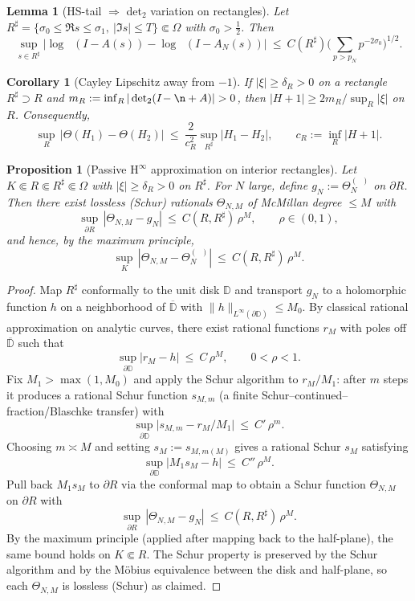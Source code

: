 \documentclass[11pt]{article}
\newtheorem{proposition}[theorem]{Proposition}
\newtheorem{lemma}[theorem]{Lemma}
\newtheorem{corollary}[theorem]{Corollary}
\theoremstyle{remark}
\DeclareMathOperator{\dettwo}{det_2}
\begin{document}
\begin{lemma}[HS-tail $\Rightarrow$ det$_2$ variation on rectangles]\label{lem:HS-tail-rectangle}
Let $R^\sharp=\{\sigma_0\le \Re s\le \sigma_1,\ |\Im s|\le T\}\Subset\Omega$ with $\sigma_0>\tfrac12$. Then
\[
 \sup_{s\in R^\sharp}\big|\log\dettwo(I-A(s))\!-\!\log\dettwo(I-A_N(s))\big|\ \le\ C(R^\sharp)\Big(\sum_{p>p_N}p^{-2\sigma_0}\Big)^{1/2}.
\]
\end{lemma}

\begin{corollary}[Cayley Lipschitz away from $-1$]\label{cor:Cayley-rect}
If $|\xi|\ge \delta_R>0$ on a rectangle $R^\sharp\supset R$ and $m_R:=\inf_{R}|\dettwo(I\!-\n+A)|>0$, then $|H+1|\ge 2m_R/\sup_{R}|\xi|$ on $R$. Consequently,
\[
 \sup_{R}\,\big|\Theta(H_1)-\Theta(H_2)\big|\ \le\ \frac{2}{c_R^2}\sup_{R^\sharp}|H_1-H_2|,\qquad c_R:=\inf_{R}|H+1|.
\]
\end{corollary}

\begin{proposition}[Passive H$^\infty$ approximation on interior rectangles]\label{prop:hinf-passive}
Let $K\Subset R\Subset R^\sharp\Subset\Omega$ with $|\xi|\ge \delta_R>0$ on $R^\sharp$. For $N$ large, define $g_N:=\Theta_N^{(\dettwo)}$ on $\partial R$. Then there exist lossless (Schur) rationals $\Theta_{N,M}$ of McMillan degree $\le M$ with
\[
 \sup_{\partial R}\,|\Theta_{N,M}-g_N|\ \le\ C(R,R^\sharp)\,\rho^{M},\qquad \rho\in(0,1),
\]
and hence, by the maximum principle,
\[
 \sup_{K}\,|\Theta_{N,M}-\Theta_N^{(\dettwo)}|\ \le\ C(R,R^\sharp)\,\rho^{M}.
\]
\end{proposition}
\begin{proof}
Map $R^\sharp$ conformally to the unit disk $\mathbb D$ and transport $g_N$ to a holomorphic function $h$ on a neighborhood of $\overline{\mathbb D}$ with $\|h\|_{L^\infty(\partial\mathbb D)}\le M_0$. By classical rational approximation on analytic curves, there exist rational functions $r_M$ with poles off $\overline{\mathbb D}$ such that
\[
 \sup_{\partial\mathbb D}|r_M-h|\ \le\ C\,\rho^M,\qquad 0<\rho<1.
\]
Fix $M_1>\max(1,M_0)$ and apply the Schur algorithm to $r_M/M_1$: after $m$ steps it produces a rational Schur function $s_{M,m}$ (a finite Schur–continued–fraction/Blaschke transfer) with
\[
 \sup_{\partial\mathbb D}\big|s_{M,m}-r_M/M_1\big|\ \le\ C'\,\rho^m.
\]
Choosing $m\asymp M$ and setting $s_M:=s_{M,m(M)}$ gives a rational Schur $s_M$ satisfying
\[
 \sup_{\partial\mathbb D}\big|M_1 s_M-h\big|\ \le\ C''\,\rho^M.
\]
Pull back $M_1 s_M$ to $\partial R$ via the conformal map to obtain a Schur function $\Theta_{N,M}$ on $\partial R$ with
\[
 \sup_{\partial R}\,|\Theta_{N,M}-g_N|\ \le\ C(R,R^\sharp)\,\rho^M.
\]
By the maximum principle (applied after mapping back to the half-plane), the same bound holds on $K\Subset R$. The Schur property is preserved by the Schur algorithm and by the Möbius equivalence between the disk and half-plane, so each $\Theta_{N,M}$ is lossless (Schur) as claimed.
\end{proof}
\end{document}
